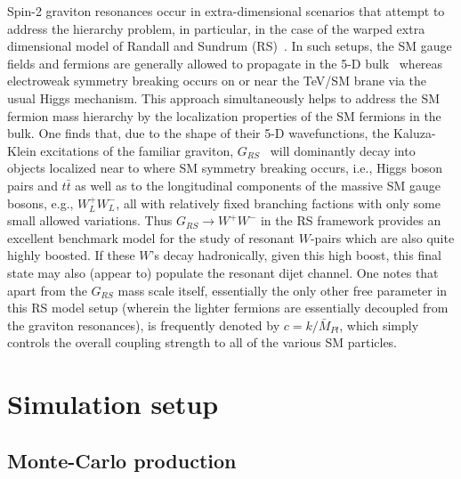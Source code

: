 \documentclass[a4paper,11pt]{article}
\begin{document}
Spin-2 graviton resonances occur in extra-dimensional scenarios that attempt to address the hierarchy problem, in particular, in the case of the warped extra dimensional model of
Randall and Sundrum (RS)~\cite{Randall:1999ee}. In such setups, the SM gauge fields and fermions are generally allowed to propagate in the 5-D
bulk~\cite{Pomarol:1999ad,Davoudiasl:1999tf,Grossman:1999ra,Davoudiasl:2000wi,Gherghetta:2000qt} whereas electroweak symmetry breaking occurs on or near the TeV/SM brane
via the usual Higgs mechanism. This approach simultaneously helps to address the SM fermion mass hierarchy by the localization properties of the SM fermions in the bulk.
One finds that, due to the shape of their 5-D wavefunctions, the Kaluza-Klein excitations of the familiar graviton, $G_{RS}$~\cite{Davoudiasl:1999jd} will dominantly decay into
objects localized near to where SM symmetry breaking occurs, i.e., Higgs boson pairs and $t\bar t$ as well as to the longitudinal components of the massive SM gauge bosons, e.g.,
$W^+_L W^-_L$, all with relatively fixed branching factions with only some small allowed variations. Thus $G_{RS}\rightarrow
W^+W^-$ in the RS framework provides an excellent benchmark model for the study of resonant $W$-pairs which are also quite highly boosted. If these $W$'s decay hadronically,
given this high boost, this final state may also (appear to) populate the resonant dijet channel. One notes that apart from the $G_{RS}$ mass scale itself, essentially the only other
free parameter in this RS model setup (wherein the lighter fermions are essentially decoupled from the graviton resonances), is frequently denoted by $c=k/\bar M_{Pl}$, which simply
controls the overall coupling strength to all of the various SM particles.


\section{Simulation setup}
\label{sec:simulation}

\subsection{Monte-Carlo production}
\label{subsec:mcprod}
\end{document}
